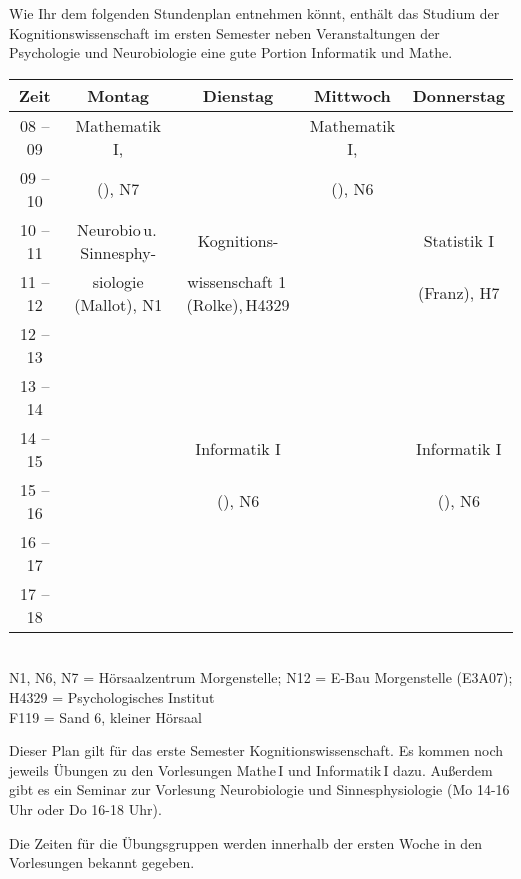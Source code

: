 Wie Ihr dem folgenden Stundenplan entnehmen könnt, enthält das Studium der Kognitionswissenschaft
im ersten Semester neben Veranstaltungen der Psychologie und Neurobiologie eine gute Portion Informatik und Mathe. 

\begin{center}
\footnotesize
\begin{tabular}{|c|c|c|c|c|} \hline
Zeit      & 			Montag 		& Dienstag							& Mittwoch 			& Donnerstag  \\
\hline\hline
08 -- 09  & 		Mathematik I, 	&									& Mathematik I, 	& \\
\cline{1-1}\cline{3-3}\cline{5-5}
09 -- 10  & 	(\Matheprof), N7	 & 									& (\Matheprof), N6 	&  \\
\cline{1-1}\cline{2-5}
10 -- 11 & Neurobio\,u.\,Sinnesphy- & Kognitions-						& 					& Statistik I \\
\cline{1-1}\cline{4-4}
11 -- 12 & siologie (Mallot), N1	& wissenschaft 1\,(Rolke),\,H4329	& 					& (Franz), H7 \\
\hline
12 -- 13 & & & & \\
\hline
13 -- 14 & & & & \\
\hline %
14 -- 15 &  						& Informatik I 						&					 & Informatik I  \\
\cline{1-2}\cline{4-4}
15 -- 16 &  						&  (\Infoprof), N6  				&					& (\Infoprof), N6  \\
\hline
16 -- 17 & & & &\\
\hline
17 -- 18 & & & & \\
\hline
\end{tabular}\\
\scriptsize  N1, N6, N7 = Hörsaalzentrum Morgenstelle; N12 = E-Bau Morgenstelle (E3A07); H4329 = Psychologisches Institut \\
F119 = Sand 6, kleiner Hörsaal
\end{center}

Dieser Plan gilt für das erste Semester Kognitionswissenschaft.
Es kommen noch jeweils Übungen zu den Vorlesungen Mathe\,I und Informatik\,I %
dazu.
Außerdem gibt es ein Seminar zur Vorlesung Neurobiologie und Sinnesphysiologie (Mo 14-16 Uhr oder Do 16-18 Uhr).

Die Zeiten für die Übungsgruppen werden innerhalb der ersten Woche in den Vorlesungen bekannt gegeben.
